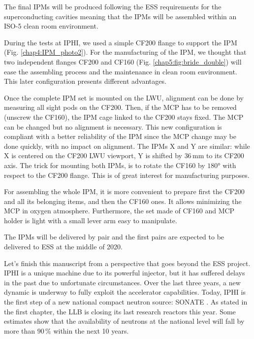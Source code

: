 

The final IPMs will be produced following the ESS requirements for the superconducting cavities meaning that the IPMs will be assembled within an ISO-5 clean room environment.

During the tests at IPHI, we used a simple CF200 flange to support the IPM (Fig. \ref{chap4:IPM_photo2}). For the manufacturing of the IPM, we thought that two independent flanges CF200 and CF160 (Fig. \ref{chap5:fig:bride_double}) will ease the assembling process and the maintenance in clean room environment. This later configuration presents different advantages.



Once the complete IPM set is mounted on the LWU, alignment can be done by measuring all sight pods on the CF200. Then, if the MCP has to be removed (unscrew the CF160), the IPM cage linked to the CF200 stays fixed. The MCP can be changed but no alignment is necessary. This new configuration is compliant with a better reliability of the IPM since the MCP change may be done quickly, with no impact on alignment. The IPMs X and Y are similar: while X is centered on the CF200 LWU viewport, Y is shifted by $36\,\mathrm{mm}$ to its CF200 axis. The trick for mounting both IPMs, is to rotate the CF160 by $180°$ with respect to the CF200 flange. This is of great interest for manufacturing purposes.

For assembling the whole IPM, it is more convenient to prepare first the CF200 and all its belonging items, and then the CF160 ones. It allows minimizing the MCP in oxygen atmosphere. Furthermore, the set made of CF160 and MCP holder is light with a small lever arm easy to manipulate.

The IPMs will be delivered by pair and the first pairs are expected to be delivered to ESS at the middle of 2020.

Let's finish this manuscript from a perspective that goes beyond the ESS project. IPHI is a unique machine due to its powerful injector, but it has suffered delays in the past due to unfortunate circumstances. Over the last three years, a new dynamic is underway to fully exploit the accelerator capabilities. Today, IPHI is the first step of a new national compact neutron source: SONATE \cite{Marchix_2018}. As stated in the first chapter, the LLB is closing its last research reactors this year. Some estimates show that the availability of neutrons at the national level will fall by more than $90\,\mathrm{\%}$ within the next 10 years.

